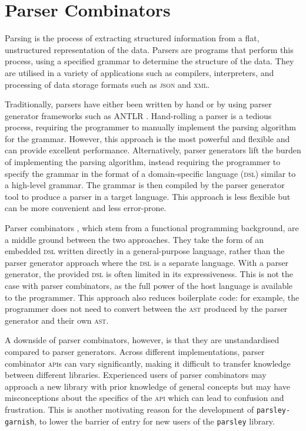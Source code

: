 \section{Parser Combinators}

Parsing is the process of extracting structured information from a flat, unstructured representation of the data.
Parsers are programs that perform this process, using a specified grammar to determine the structure of the data.
They are utilised in a variety of applications such as compilers, interpreters, and processing of data storage formats such as \textsc{json} and \textsc{xml}.

Traditionally, parsers have either been written by hand or by using parser generator frameworks such as ANTLR \cite{parr_antlr_2013}.
Hand-rolling a parser is a tedious process, requiring the programmer to manually implement the parsing algorithm for the grammar.
However, this approach is the most powerful and flexible and can provide excellent performance.
Alternatively, parser generators lift the burden of implementing the parsing algorithm, instead requiring the programmer to specify the grammar in the format of a domain-specific language (\textsc{dsl}) similar to a high-level grammar.
The grammar is then compiled by the parser generator tool to produce a parser in a target language.
This approach is less flexible but can be more convenient and less error-prone.

Parser combinators \cite{hutton_higher-order_1992}, which stem from a functional programming background, are a middle ground between the two approaches.
They take the form of an embedded \textsc{dsl} written directly in a general-purpose language, rather than the parser generator approach where the \textsc{dsl} is a separate language.
With a parser generator, the provided \textsc{dsl} is often limited in its expressiveness.
This is not the case with parser combinators, as the full power of the host language is available to the programmer.
This approach also reduces boilerplate code: for example, the programmer does not need to convert between the \textsc{ast} produced by the parser generator and their own \textsc{ast}.

A downside of parser combinators, however, is that they are unstandardised compared to parser generators.
Across different implementations, parser combinator \textsc{api}s can vary significantly, making it difficult to transfer knowledge between different libraries.
Experienced users of parser combinators may approach a new library with prior knowledge of general concepts but may have misconceptions about the specifics of the \textsc{api} which can lead to confusion and frustration.
This is another motivating reason for the development of \texttt{parsley-garnish}, to lower the barrier of entry for new users of the \texttt{parsley} library.

